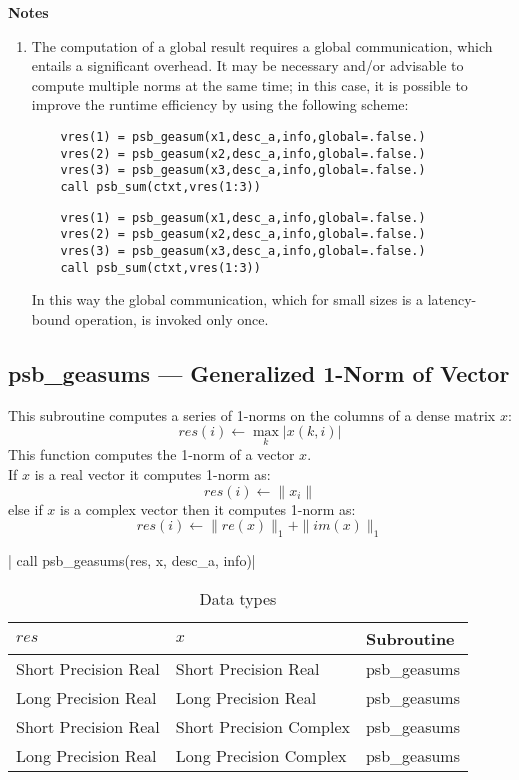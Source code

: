 {\par\noindent\large\bfseries Notes}
\begin{enumerate}
\item The computation of a global result requires a global
  communication, which entails a significant overhead. It may be
  necessary and/or advisable to compute multiple norms at the same
  time; in this case, it is possible to improve the runtime efficiency
  by using the following scheme:
  \ifpdf
  \begin{verbatim}
    vres(1) = psb_geasum(x1,desc_a,info,global=.false.)
  	vres(2) = psb_geasum(x2,desc_a,info,global=.false.)
  	vres(3) = psb_geasum(x3,desc_a,info,global=.false.)
  	call psb_sum(ctxt,vres(1:3))
  \end{verbatim}
  \else
  \begin{lstlisting}
    vres(1) = psb_geasum(x1,desc_a,info,global=.false.)
    vres(2) = psb_geasum(x2,desc_a,info,global=.false.)
    vres(3) = psb_geasum(x3,desc_a,info,global=.false.)
    call psb_sum(ctxt,vres(1:3))
  \end{lstlisting}
  \fi
  In this way the global communication, which for small sizes is a
  latency-bound operation, is invoked only once.
\end{enumerate}


\clearpage\subsection{psb\_geasums --- Generalized 1-Norm of Vector}

This subroutine computes a series of  1-norms on the columns of
a  dense matrix  $x$:
\[ res(i) \leftarrow \max_k |x(k,i)| \]
This function computes the 1-norm of a vector $x$.\\
If $x$ is a real vector
it computes 1-norm as:
\[ res(i) \leftarrow  \|x_i\|\]
else if $x$ is a complex vector then it computes 1-norm  as:
\[ res(i) \leftarrow \|re(x)\|_1 + \|im(x)\|_1\]


\fortinline| call psb_geasums(res, x, desc_a, info)|

\begin{table}[h]
\begin{center}
\begin{tabular}{lll}
\hline
$res$ & $x$ & {\bf Subroutine}\\
\hline
Short Precision Real&Short Precision Real & psb\_geasums \\
Long Precision Real&Long Precision Real & psb\_geasums \\
Short Precision Real&Short Precision Complex & psb\_geasums \\
Long Precision Real&Long Precision Complex & psb\_geasums \\
\hline
\end{tabular}
\end{center}
\caption{Data types\label{tab:f90asums}}
\end{table}

